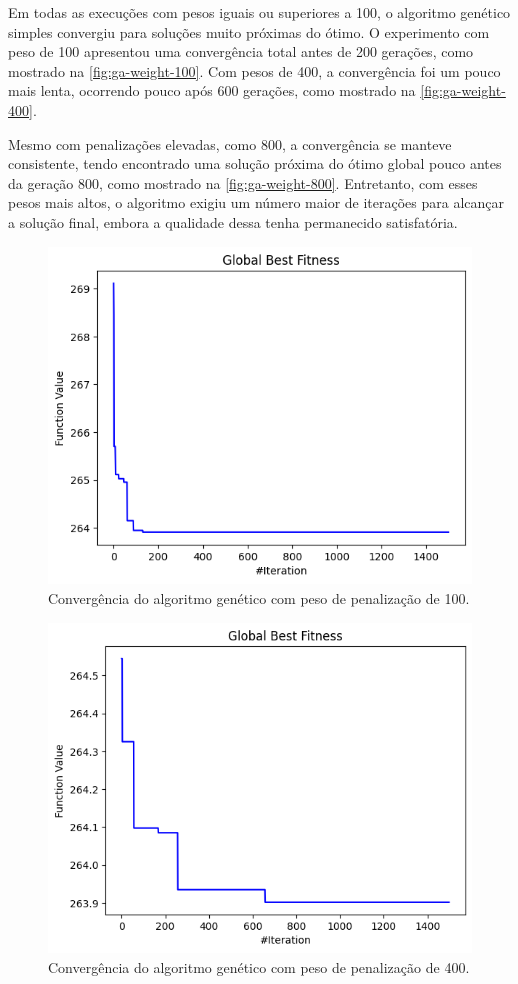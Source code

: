 


Em todas as execuções com pesos iguais ou superiores a 100, o algoritmo genético simples convergiu para soluções muito próximas do ótimo.
O experimento com peso de 100 apresentou uma convergência total antes de 200 gerações, como mostrado na \autoref{fig:ga-weight-100}.
Com pesos de 400, a convergência foi um pouco mais lenta, ocorrendo pouco após 600 gerações, como mostrado na \autoref{fig:ga-weight-400}.

Mesmo com penalizações elevadas, como 800, a convergência se manteve consistente, tendo encontrado uma solução próxima do ótimo global pouco antes da geração 800, como mostrado na \autoref{fig:ga-weight-800}.
Entretanto, com esses pesos mais altos, o algoritmo exigiu um número maior de iterações para alcançar a solução final, embora a qualidade dessa tenha permanecido satisfatória.

\begin{figure}
    \centering
    \includegraphics[width=.6\linewidth]{images/weight/100.png}
    \caption{Convergência do algoritmo genético com peso de penalização de 100.}%
    \label{fig:ga-weight-100}
\end{figure}

\begin{figure}
    \centering
    \includegraphics[width=.6\linewidth]{images/weight/400.png}
    \caption{Convergência do algoritmo genético com peso de penalização de 400.}%
    \label{fig:ga-weight-400}
\end{figure}

